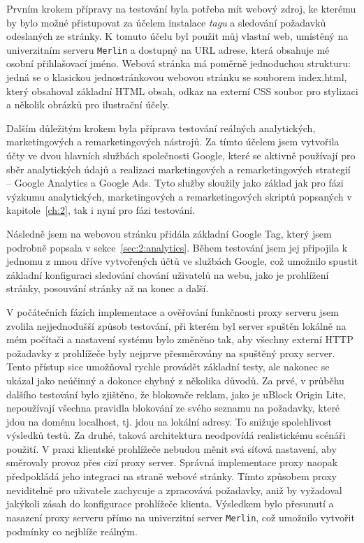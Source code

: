 Prvním krokem přípravy na testování byla potřeba mít webový zdroj, ke kterému by bylo možné přistupovat za účelem instalace {\it tagu} a sledování požadavků odeslaných ze stránky. K tomuto účelu byl použit můj vlastní web, umístěný na univerzitním serveru \texttt{Merlin} a dostupný na URL adrese, která obsahuje mé osobní přihlašovací jméno. Webová stránka má poměrně jednoduchou strukturu: jedná se o klasickou jednostránkovou webovou stránku se souborem index.html, který obsahoval základní HTML obsah, odkaz na externí CSS soubor pro stylizaci a několik obrázků pro ilustrační účely.

Dalším důležitým krokem byla příprava testování reálných analytických, marketingových a remarketingových nástrojů. Za tímto účelem jsem vytvořila účty ve dvou hlavních službách společnosti Google, které se aktivně používají pro sběr analytických údajů a realizaci marketingových a remarketingových strategií -- Google Analytics a Google Ads. Tyto služby sloužily jako základ jak pro fázi výzkumu analytických, marketingových a remarketingových skriptů popsaných v kapitole~\ref{ch:2}, tak i nyní pro fázi testování. 

Následně jsem na webovou stránku přidála základní Google Tag, který jsem podrobně popsala v sekce~\ref{sec:2:analytics}. Během testování jsem jej připojila k jednomu z mnou dříve vytvořených účtů ve službách Google, což umožnilo spustit základní konfiguraci sledování chování uživatelů na webu, jako je prohlížení stránky, posouvání stránky až na konec a další. 

V počátečních fázích implementace a ověřování funkčnosti proxy serveru jsem zvolila nejjednodušší způsob testování, při kterém byl server spuštěn lokálně na mém počítači a nastavení systému bylo změněno tak, aby všechny externí HTTP požadavky z prohlížeče byly nejprve přesměrovány na spuštěný proxy server. Tento přístup sice umožňoval rychle provádět základní testy, ale nakonec se ukázal jako neúčinný a dokonce chybný z několika důvodů. Za prvé, v průběhu dalšího testování bylo zjištěno, že blokovače reklam, jako je uBlock Origin Lite, nepoužívají všechna pravidla blokování ze svého seznamu na požadavky, které jdou na doménu localhost, tj. jdou na lokální adresy. To snižuje spolehlivost výsledků testů. Za druhé, taková architektura neodpovídá realistickému scénáři použití. V praxi klientské prohlížeče nebudou měnit svá síťová nastavení, aby směrovaly provoz přes cizí proxy server. Správná implementace proxy naopak předpokládá jeho integraci na straně webové stránky. Tímto způsobem proxy neviditelně pro uživatele zachycuje a zpracovává požadavky, aniž by vyžadoval jakýkoli zásah do konfigurace prohlížeče klienta. Výsledkem bylo přesunutí a nasazení proxy serveru přímo na univerzitní server \texttt{Merlin}, což umožnilo vytvořit podmínky co nejblíže reálným.

